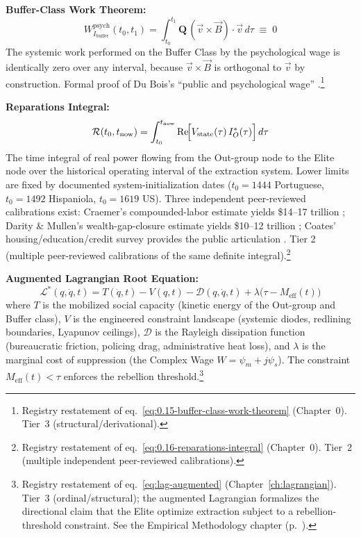 \begin{definition}
\textbf{Buffer-Class Work Theorem:}
\begin{equation}\label{eq:19.13-buffer-work-theorem-registry}
W_{I_{\text{buffer}}}^{\text{psych}}(t_0, t_1) = \int_{t_0}^{t_1} \mathbf{Q}\,(\vec{v} \times \vec{B}) \cdot \vec{v}\, d\tau \;\equiv\; 0
\end{equation}
The systemic work performed on the Buffer Class by the psychological
wage is identically zero over any interval, because $\vec{v} \times \vec{B}$
is orthogonal to $\vec{v}$ by construction. Formal proof of Du Bois's
``public and psychological wage'' \cite{dubois}.\footnote{Registry restatement of eq.~\eqref{eq:0.15-buffer-class-work-theorem} (Chapter~0). Tier~3 (structural/derivational).}

\textbf{Reparations Integral:}
\begin{equation}\label{eq:19.14-reparations-integral-registry}
\mathcal{R}(t_0, t_{\text{now}}) = \int_{t_0}^{t_{\text{now}}} \operatorname{Re}\!\Bigl[V_{\text{state}}(\tau)\, I_{O}^{*}(\tau)\Bigr]\, d\tau
\end{equation}
The time integral of real power flowing from the Out-group node to the
Elite node over the historical operating interval of the extraction
system. Lower limits are fixed by documented system-initialization
dates ($t_0 = 1444$ Portuguese, $t_0 = 1492$ Hispaniola, $t_0 = 1619$
US). Three independent peer-reviewed calibrations exist: Craemer's
compounded-labor estimate yields \$14--17 trillion \cite{craemer2015slavery};
Darity \& Mullen's wealth-gap-closure estimate yields \$10--12 trillion
\cite{darity_mullen}; Coates' housing/education/credit
survey provides the public articulation \cite{coates_case_for_reparations}.
Tier 2 (multiple peer-reviewed calibrations of the same definite integral).\footnote{Registry restatement of eq.~\eqref{eq:0.16-reparations-integral} (Chapter~0). Tier~2 (multiple independent peer-reviewed calibrations).}

\textbf{Augmented Lagrangian Root Equation:}
\begin{equation}\label{eq:lag-root-registry}
\mathcal{L}^*(q,\dot{q},t) = T(\dot{q},t) - V(q,t) - \mathcal{D}(q,\dot{q},t) + \lambda\bigl(\tau - M_{\mathrm{eff}}(t)\bigr)
\end{equation}
where $T$ is the mobilized social capacity (kinetic energy of the Out-group and Buffer class), $V$ is the engineered constraint landscape (systemic diodes, redlining boundaries, Lyapunov ceilings), $\mathcal{D}$ is the Rayleigh dissipation function (bureaucratic friction, policing drag, administrative heat loss), and $\lambda$ is the marginal cost of suppression (the Complex Wage $W = \psi_m + j\psi_s$). The constraint $M_{\mathrm{eff}}(t) < \tau$ enforces the rebellion threshold.\footnote{Registry restatement of eq.~\eqref{eq:lag-augmented} (Chapter~\ref{ch:lagrangian}). Tier~3 (ordinal/structural); the augmented Lagrangian formalizes the directional claim that the Elite optimize extraction subject to a rebellion-threshold constraint. See the Empirical Methodology chapter (p.~\pageref{ch:empirical_methodology}).}
\end{definition}

